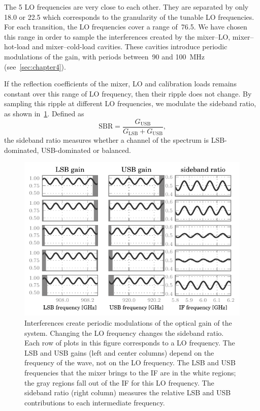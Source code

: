 The 5 LO frequencies are very close to each other.
They are separated by only \num{18.0} or \SI{22.5}{\megahertz}
which corresponds to the granularity of the tunable LO frequencies.
For each transition, the LO frequencies cover a range of~\SI{76.5}{\megahertz}.
We have chosen this range in order to sample the interferences created by the mixer--LO, mixer--hot-load and mixer--cold-load cavities.
These cavities introduce periodic modulations of the gain, with periods between~\num{90} and \SI{100}{\mega\hertz} (see~\cref{sec:chapter4}).

If the reflection coefficients of the mixer, LO and calibration loads remains constant over this range of LO frequency, then their ripple does not change.
By sampling this ripple at different LO frequencies, we modulate the sideband ratio, as shown in~\cref{fig:lo_scan_of_ripple}.
Defined as
\begin{equation}
    \text{SBR} =
    \frac{
        G_\text{USB}
    }{
        G_\text{LSB} + G_\text{USB}
    }
    \text{,}
    \label{eq:sbr_definition_chp5}
\end{equation}
the sideband ratio measures whether a channel of the spectrum is LSB-dominated, USB-dominated or balanced.

\begin{figure}
    \centering
    \includegraphics{lo_scan_of_ripple}
    \caption{
        Interferences create periodic modulations of the optical gain of the system.
        Changing the LO frequency changes the sideband ratio.
        Each row of plots in this figure corresponds to a LO frequency.
        The LSB and USB gains (left and center columns) depend on the frequency of the wave, not on the LO frequency.
        The LSB and USB frequencies that the mixer brings to the IF are in the white
        regions; the gray regions fall out of the IF for this LO frequency.
        The sideband ratio (right column) measures the relative LSB and USB contributions to each intermediate frequency.
    }
    \label{fig:lo_scan_of_ripple}
\end{figure}



